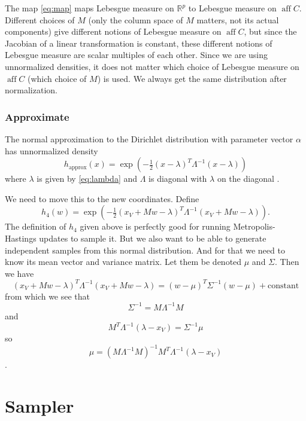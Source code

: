 \documentclass[11pt]{article}
\DeclareMathOperator{\aff}{aff}
\newcommand{\real}{\mathbb{R}}
\begin{document}
The map \eqref{eq:map} maps Lebesgue measure on $\real^p$ to Lebesgue measure
on $\aff C$.  Different choices of $M$ (only the column space of $M$ matters,
not its actual components) give different notions of Lebesgue measure on
$\aff C$, but since the Jacobian of a linear transformation is constant,
these different notions of Lebesgue measure are scalar multiples of each other.
Since we are using unnormalized densities, it does not matter which choice
of Lebesgue measure on $\aff C$ (which choice of $M$) is used.
We always get the same distribution after normalization.

\subsubsection{Approximate}

The normal approximation to the Dirichlet distribution with
parameter vector $\alpha$ has unnormalized density
$$
   h_{\text{approx}}(x)
   =
   \exp\left(- \tfrac{1}{2} (x - \lambda)^T \Lambda^{- 1} (x - \lambda) \right)
$$
where $\lambda$ is given by \eqref{eq:lambda} and $\Lambda$ is diagonal
with $\lambda$ on the diagonal \citep[Theorem~4.2]{geyer-meeden}.

We need to move this to the new coordinates.  Define
\begin{equation} \label{eq:h-approx-new}
   h_4(w)
   =
   \exp\left(- \tfrac{1}{2} (x_V + M w - \lambda)^T
   \Lambda^{- 1} (x_V + M w - \lambda) \right).
\end{equation}
The definition of $h_4$ given above is perfectly good for running
Metropolis-Hastings updates to sample it.  But we also want to
be able to generate independent samples from this normal distribution.
And for that we need to know its mean vector and variance matrix.
Let them be denoted $\mu$ and $\Sigma$.  Then we have
$$
   (x_V + M w - \lambda)^T \Lambda^{- 1} (x_V + M w - \lambda)
   =
   (w - \mu)^T \Sigma^{- 1} (w - \mu) + \text{constant}
$$
from which we see that
\begin{equation} \label{eq:h-approx-new-variance}
   \Sigma^{- 1} = M \Lambda^{- 1} M
\end{equation}
and
$$
   M^T \Lambda^{- 1} (\lambda - x_V) = \Sigma^{- 1} \mu
$$
so
\begin{equation} \label{eq:h-approx-new-mean}
   \mu = \left( M \Lambda^{- 1} M \right)^{- 1}
   M^T \Lambda^{- 1} (\lambda - x_V)
\end{equation}
\citep[compare equation (25) in][]{geyer-meeden}.

\section{Sampler}
\end{document}
